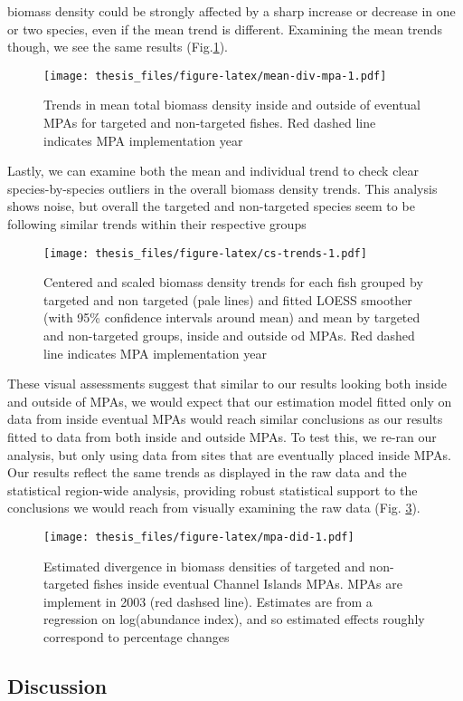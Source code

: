\documentclass[twoside,12pt,final]{ucthesis-CA2012}
\begin{document}
\begin{ucmainmatter}
biomass density could be strongly affected by a sharp increase or
decrease in one or two species, even if the mean trend is different.
Examining the mean trends though, we see the same results
(Fig.\ref{fig:mean-div-mpa}).
\begin{figure}
\centering
\texttt{[image: thesis\_files/figure-latex/mean-div-mpa-1.pdf]}
\caption{\label{fig:mean-div-mpa}Trends in mean total biomass density inside
and outside of eventual MPAs for targeted and non-targeted fishes. Red
dashed line indicates MPA implementation year}
\end{figure}
Lastly, we can examine both the mean and individual trend to check clear
species-by-species outliers in the overall biomass density trends. This
analysis shows noise, but overall the targeted and non-targeted species
seem to be following similar trends within their respective groups
\begin{figure}
\centering
\texttt{[image: thesis\_files/figure-latex/cs-trends-1.pdf]}
\caption{\label{fig:cs-trends}Centered and scaled biomass density trends for
each fish grouped by targeted and non targeted (pale lines) and fitted
LOESS smoother (with 95\% confidence intervals around mean) and mean by
targeted and non-targeted groups, inside and outside od MPAs. Red dashed
line indicates MPA implementation year}
\end{figure}
These visual assessments suggest that similar to our results looking
both inside and outside of MPAs, we would expect that our estimation
model fitted only on data from inside eventual MPAs would reach similar
conclusions as our results fitted to data from both inside and outside
MPAs. To test this, we re-ran our analysis, but only using data from
sites that are eventually placed inside MPAs. Our results reflect the
same trends as displayed in the raw data and the statistical region-wide
analysis, providing robust statistical support to the conclusions we
would reach from visually examining the raw data (Fig.
\ref{fig:mpa-did}).
\begin{figure}
\centering
\texttt{[image: thesis\_files/figure-latex/mpa-did-1.pdf]}
\caption{\label{fig:mpa-did}Estimated divergence in biomass densities of
targeted and non-targeted fishes inside eventual Channel Islands MPAs.
MPAs are implement in 2003 (red dashsed line). Estimates are from a
regression on log(abundance index), and so estimated effects roughly
correspond to percentage changes}
\end{figure}
\subsection{Discussion}\label{discussion-1}


\end{ucmainmatter}
\end{document}
